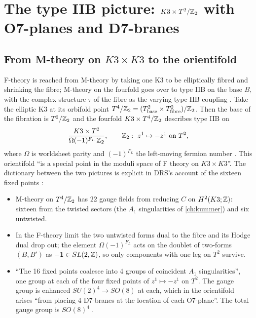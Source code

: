 \section{The type IIB picture: \texorpdfstring{$K3\times T^2/\mathbb{Z}_2$}{K3 x T2 / Z2} with O7-planes and
D7-branes}\label{sec:tadpole:iib}

\subsection{From M-theory on \texorpdfstring{$K3\times K3$}{K3 x K3} to the orientifold}
F-theory is reached from M-theory by taking one K3 to be elliptically fibred and shrinking
the fibre; M-theory on the fourfold goes over to type IIB on the base $B$, with the complex
structure $\tau$ of the fibre as the varying type IIB coupling
. Take the elliptic K3 at its orbifold point
$T^4/\mathbb{Z}_2=(T^2_{\text{base}}\times T^2_{\text{fibre}})/\mathbb{Z}_2$. Then the base of the fibration
is $T^2/\mathbb{Z}_2$ and the fourfold $K3\times T^4/\mathbb{Z}_2$ describes type IIB on
\begin{equation}\label{eq:tadpole:orientifold}
 \frac{\KT}{\Omega(-1)^{F_L}\,\Z_2},\qquad \Z_2:\ z^1\mapsto-z^1\ \text{on }T^2 ,
\end{equation}
where $\Omega$ is worldsheet parity and $(-1)^{F_L}$ the left-moving fermion number
. This orientifold ``is a special
point in the moduli space of F theory on $K3\times K3$''. The dictionary between the two
pictures is explicit in DRS's account of the sixteen fixed points
:
\begin{itemize}[leftmargin=2em]
\item M-theory on $T^4/\mathbb{Z}_2$ has $22$ gauge fields from reducing $C$ on $H^2(K3;\mathbb{Z})$: sixteen
 from the twisted sectors (the $A_1$ singularities of \cref{ch:kummer}) and six untwisted.
\item In the F-theory limit the two untwisted forms dual to the fibre and its Hodge dual
 drop out; the element $\Omega(-1)^{F_L}$ acts on the doublet of two-forms $(B,B')$ as
 $-\mathbf 1\in SL(2,\mathbb{Z})$, so only components with one leg on $T^2$ survive.
\item ``The 16 fixed points coalesce into 4 groups of coincident $A_1$ singularities'', one
 group at each of the four fixed points of $z^1\mapsto-z^1$ on $T^2$. The gauge group is
 enhanced $SU(2)^4\to SO(8)$ at each, which in the orientifold arises ``from placing 4
 D7-branes at the location of each O7-plane''. The total gauge group is $SO(8)^4$
 .
\end{itemize}

